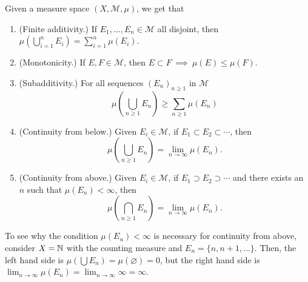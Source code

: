 \documentclass[11pt,leqno,oneside]{amsbook}
\numberwithin{thm}{section}
\newcommand{\M}{\mathcal{M}}
\renewcommand{\emptyset}{\varnothing}
\begin{document}
\begin{thm}
  Given a measure space $(X,\M,\mu)$, we get that
  \begin{enumerate}
  \item (Finite additivity.) If $E_1, \ldots, E_n \in \M$ all disjoint,
    then $\mu(\bigcup_{i=1}^n E_i) = \sum_{i = 1}^n \mu(E_i)$.
  \item (Monotonicity.) If $E,F \in \M$, then $E \subset F \ \implies
    \ \mu(E) \leq \mu(F)$.
  \item (Subadditivity.) For all sequences $(E_n)_{n \geq 1}$ in
    $\M$ \[
      \mu\left( \bigcup_{n \geq 1} E_n \right) \geq \sum_{n \geq 1} \mu(E_n)
    \]
  \item (Continuity from below.) Given $E_i \in \M$, if $E_1 \subset
    E_2 \subset \cdots$,
    then \[
      \mu(\bigcup_{n \geq 1} E_n) = \lim_{n \to \infty} \mu(E_n).
    \]
  \item (Continuity from above.) Given $E_i \in \M$, if  $E_1 \supset
    E_2 \supset \cdots$ and there exists an $n$ such that $\mu(E_n) <
    \infty$,
    then \[
      \mu(\bigcap_{n \geq 1} E_n) = \lim_{n \to \infty} \mu(E_n).
    \]
  \end{enumerate}
\end{thm}
\begin{example}
  To see why the condition $\mu(E_n) < \infty$ is necessary for
  continuity from above, consider $X = {\mathbb N}$ with the counting measure
  and $E_n = \{n,n+1,\ldots\}$. Then, the left hand side is
  $\mu(\bigcup E_n) = \mu(\emptyset) = 0$, but the right hand side is
  $\lim_{n \to \infty} \mu(E_n) = \lim_{n \to \infty} \infty =
  \infty$.
\end{example}
\end{document}
